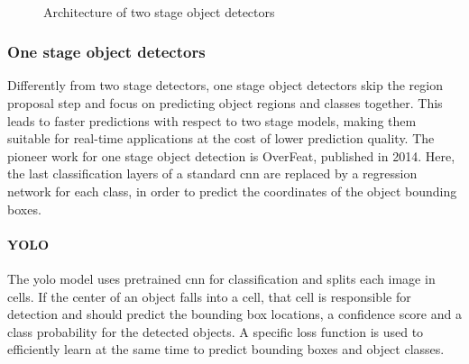 \documentclass[%
    corpo=12pt,
    twoside,
    stile=classica,   
    tipotesi=magistrale,
    evenboxes,
    english,
	numerazioneromana,
]{toptesi}
\begin{document}
\begin{figure}[ht]
	\centering
	\\
	\caption{Architecture of two stage object detectors}
	\label{fig:architectures}
\end{figure}

\subsubsection{One stage object detectors}
Differently from two stage detectors, one stage object detectors skip the region proposal step and focus on predicting object regions and classes together. This leads to faster predictions with respect to two stage models, making them suitable for real-time applications at the cost of lower prediction quality. The pioneer work for one stage object detection is OverFeat\cite{sermanet2014overfeat}, published in 2014. Here, the last classification layers of a standard \gls{cnn} are replaced by a regression network for each class, in order to predict the coordinates of the object bounding boxes.

\paragraph{YOLO}\label{sec:yolo}
The \gls{yolo} model\cite{redmon2016look} uses pretrained \gls{cnn} for classification and splits each image in cells. If the center of an object falls into a cell, that cell is responsible for detection and should predict the bounding box locations, a confidence score and a class probability for the detected objects. A specific loss function is used to efficiently learn at the same time to predict bounding boxes and object classes.
\end{document}
